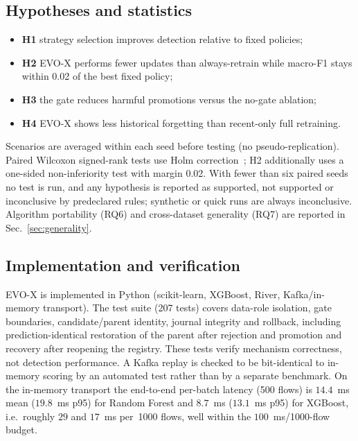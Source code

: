 \documentclass[conference]{IEEEtran}
\newcommand{\evox}{\textsc{EVO-X}}
\begin{document}
\subsection{Hypotheses and statistics}
\begin{itemize}
  \item \textbf{H1} strategy selection improves detection relative to fixed policies;
  \item \textbf{H2} \evox{} performs fewer updates than always-retrain while macro-F1 stays within 0.02 of the best fixed policy;
  \item \textbf{H3} the gate reduces harmful promotions versus the no-gate ablation;
  \item \textbf{H4} \evox{} shows less historical forgetting than recent-only full retraining.
\end{itemize}
Scenarios are averaged within each seed before testing (no pseudo-replication). Paired Wilcoxon signed-rank tests use Holm correction~\cite{wilcoxon1945,holm1979}; H2 additionally uses a one-sided non-inferiority test with margin 0.02. With fewer than six paired seeds no test is run, and any hypothesis is reported as supported, not supported or inconclusive by predeclared rules; synthetic or quick runs are always inconclusive. Algorithm portability (RQ6) and cross-dataset generality (RQ7) are reported in Sec.~\ref{sec:generality}.

\subsection{Implementation and verification}
\evox{} is implemented in Python (scikit-learn, XGBoost, River, Kafka/in-memory transport). The test suite (207 tests) covers data-role isolation, gate boundaries, candidate/parent identity, journal integrity and rollback, including prediction-identical restoration of the parent after rejection and promotion and recovery after reopening the registry. These tests verify mechanism correctness, not detection performance. A Kafka replay is checked to be bit-identical to in-memory scoring by an automated test rather than by a separate benchmark. On the in-memory transport the end-to-end per-batch latency (500 flows) is $14.4$~ms mean ($19.8$~ms p95) for Random Forest and $8.7$~ms ($13.1$~ms p95) for XGBoost, i.e.\ roughly $29$ and $17$~ms per~1000 flows, well within the $100$~ms/1000-flow budget.

\end{document}
